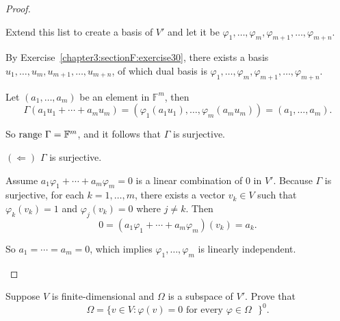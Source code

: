 \begin{proof}
\begin{enumerate}[label={(\alph*)}]
              Extend this list to create a basis of $V'$ and let it be $\varphi_{1}, \ldots, \varphi_{m}, \varphi_{m+1}, \ldots, \varphi_{m+n}$.

              By Exercise~\ref{chapter3:sectionF:exercise30}, there exists a basis $u_{1}, \ldots, u_{m}, u_{m+1}, \ldots, u_{m+n}$, of which dual basis is $\varphi_{1}, \ldots, \varphi_{m}, \varphi_{m+1}, \ldots, \varphi_{m+n}$.

              Let $(a_{1}, \ldots, a_{m})$ be an element in $\mathbb{F}^{m}$, then
              \[
                  \Gamma(a_{1}u_{1} + \cdots + a_{m}u_{m}) = (\varphi_{1}(a_{1}u_{1}), \ldots, \varphi_{m}(a_{m}u_{m})) = (a_{1}, \ldots, a_{m}).
              \]

              So $\operatorname{range}\,{\Gamma} = \mathbb{F}^{m}$, and it follows that $\Gamma$ is surjective.

              $(\Leftarrow)$ $\Gamma$ is surjective.

              Assume $a_{1}\varphi_{1} + \cdots + a_{m}\varphi_{m} = 0$ is a linear combination of $0$ in $V'$. Because $\Gamma$ is surjective, for each $k = 1,\ldots, m$, there exists a vector $v_{k}\in V$ such that $\varphi_{k}(v_{k}) = 1$ and $\varphi_{j}(v_{k}) = 0$ where $j\ne k$. Then
              \[
                  0 = (a_{1}\varphi_{1} + \cdots + a_{m}\varphi_{m})(v_{k}) = a_{k}.
              \]

              So $a_{1} = \cdots = a_{m} = 0$, which implies $\varphi_{1}, \ldots, \varphi_{m}$ is linearly independent.\qedhere
    \end{enumerate}
\end{proof}
\newpage

\begin{exercise}\label{chapter3:sectionF:exercise26}
    Suppose $V$ is finite-dimensional and $\Omega$ is a subspace of $V'$. Prove that
    \[
        \Omega = {\{ v\in V: \varphi(v) = 0 \text{ for every $\varphi\in \Omega$ } \}}^{0}.
    \]
\end{exercise}

